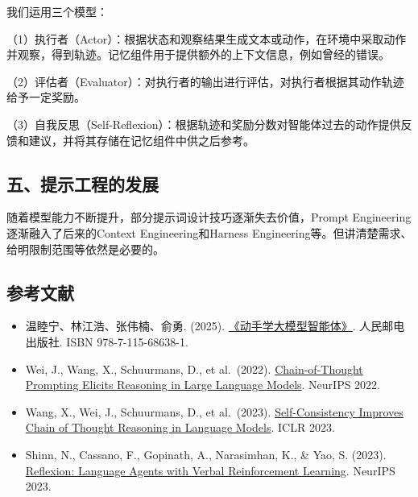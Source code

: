 我们运用三个模型：

（1）执行者（Actor）：根据状态和观察结果生成文本或动作，在环境中采取动作并观察，得到轨迹。记忆组件用于提供额外的上下文信息，例如曾经的错误。

（2）评估者（Evaluator）：对执行者的输出进行评估，对执行者根据其动作轨迹给予一定奖励。

（3）自我反思（Self-Reflexion）：根据轨迹和奖励分数对智能体过去的动作提供反馈和建议，并将其存储在记忆组件中供之后参考。

\hypertarget{ux4e94ux63d0ux793aux5de5ux7a0bux7684ux53d1ux5c55}{%
\subsection{五、提示工程的发展}\label{ux4e94ux63d0ux793aux5de5ux7a0bux7684ux53d1ux5c55}}

随着模型能力不断提升，部分提示词设计技巧逐渐失去价值，Prompt Engineering逐渐融入了后来的Context Engineering和Harness Engineering等。但讲清楚需求、给明限制范围等依然是必要的。

\FloatBarrier
{}
\hypertarget{ux53c2ux8003ux6587ux732e-115}{%
\subsection{参考文献}\label{ux53c2ux8003ux6587ux732e-115}}

\vspace{0.25em}
\begin{itemize}
\tightlist
\item
  温睦宁、林江浩、张伟楠、俞勇. (2025). \href{https://haa.boyuai.com/}{《动手学大模型智能体》}. 人民邮电出版社. ISBN 978-7-115-68638-1.
\item
  Wei, J., Wang, X., Schuurmans, D., et al.~(2022). \href{https://arxiv.org/abs/2201.11903}{Chain-of-Thought Prompting Elicits Reasoning in Large Language Models}. NeurIPS 2022.
\item
  Wang, X., Wei, J., Schuurmans, D., et al.~(2023). \href{https://openreview.net/forum?id=1PL1NIMMrw}{Self-Consistency Improves Chain of Thought Reasoning in Language Models}. ICLR 2023.
\item
  Shinn, N., Cassano, F., Gopinath, A., Narasimhan, K., \& Yao, S. (2023). \href{https://arxiv.org/abs/2303.11366}{Reflexion: Language Agents with Verbal Reinforcement Learning}. NeurIPS 2023.
\end{itemize}

\clearpage
